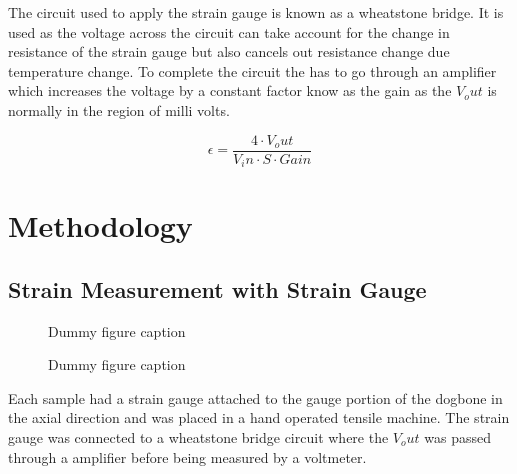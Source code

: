 \documentclass[a4paper,10pt]{article}
\begin{document}
The circuit used to apply the strain gauge is known as a wheatstone bridge. It is used as the voltage across the circuit can take account for the change in resistance of the strain gauge but also cancels out resistance change due temperature change. To complete the circuit the has to go through an amplifier which increases the voltage by a constant factor know as the gain as the $V_out$ is normally in the region of milli volts.

\begin{equation}
 \label{Strain Gauge}
 \epsilon = \frac{4 \cdot V_out}{V_in \cdot S \cdot Gain}
\end{equation}










\section{Methodology}
\subsection{Strain Measurement with Strain Gauge}

\begin{figure}[h]
  \caption{Dummy figure caption}
  \label{fig:dummy 1}
\end{figure}
\begin{figure}[h]
  \caption{Dummy figure caption}
  \label{fig:dummy 1}
\end{figure}

Each sample had a strain gauge attached to the gauge portion of the dogbone in the axial direction and was placed in a hand operated tensile machine. The strain gauge was connected to a wheatstone bridge circuit where the $V_out$ was passed through a amplifier before being measured by a voltmeter.\newline
\end{document}

